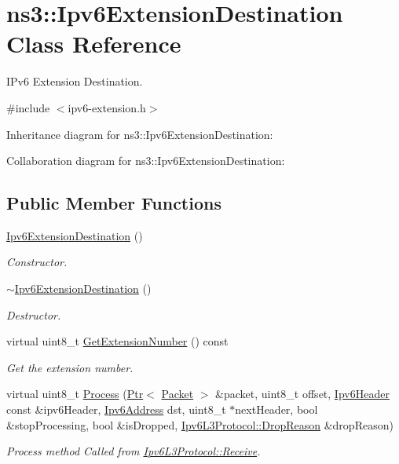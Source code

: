 \hypertarget{classns3_1_1Ipv6ExtensionDestination}{}\section{ns3\+:\+:Ipv6\+Extension\+Destination Class Reference}
\label{classns3_1_1Ipv6ExtensionDestination}


I\+Pv6 Extension Destination.  




{\ttfamily \#include $<$ipv6-\/extension.\+h$>$}



Inheritance diagram for ns3\+:\+:Ipv6\+Extension\+Destination\+:


Collaboration diagram for ns3\+:\+:Ipv6\+Extension\+Destination\+:
\subsection*{Public Member Functions}
\begin{DoxyCompactItemize}
\item 
\hyperlink{classns3_1_1Ipv6ExtensionDestination_a1f9e600b59c02a934da5cb0111a722d6}{Ipv6\+Extension\+Destination} ()
\begin{DoxyCompactList}\small\item\em Constructor. \end{DoxyCompactList}\item 
\hyperlink{classns3_1_1Ipv6ExtensionDestination_aefb452841c821465ad33c2d7c84c3adb}{$\sim$\+Ipv6\+Extension\+Destination} ()
\begin{DoxyCompactList}\small\item\em Destructor. \end{DoxyCompactList}\item 
virtual uint8\+\_\+t \hyperlink{classns3_1_1Ipv6ExtensionDestination_a39828a9eb6b80af10072077ae9af3311}{Get\+Extension\+Number} () const 
\begin{DoxyCompactList}\small\item\em Get the extension number. \end{DoxyCompactList}\item 
virtual uint8\+\_\+t \hyperlink{classns3_1_1Ipv6ExtensionDestination_a27dac28c59322d3f5b2c9830f669db61}{Process} (\hyperlink{classns3_1_1Ptr}{Ptr}$<$ \hyperlink{classns3_1_1Packet}{Packet} $>$ \&packet, uint8\+\_\+t offset, \hyperlink{classns3_1_1Ipv6Header}{Ipv6\+Header} const \&ipv6\+Header, \hyperlink{classns3_1_1Ipv6Address}{Ipv6\+Address} dst, uint8\+\_\+t $\ast$next\+Header, bool \&stop\+Processing, bool \&is\+Dropped, \hyperlink{classns3_1_1Ipv6L3Protocol_a33c64db9bc35f71ff368b132bfffa37a}{Ipv6\+L3\+Protocol\+::\+Drop\+Reason} \&drop\+Reason)
\begin{DoxyCompactList}\small\item\em Process method Called from \hyperlink{classns3_1_1Ipv6L3Protocol_a8a95d576e8aee9a571db93bf686d850a}{Ipv6\+L3\+Protocol\+::\+Receive}. \end{DoxyCompactList}\end{DoxyCompactItemize}
